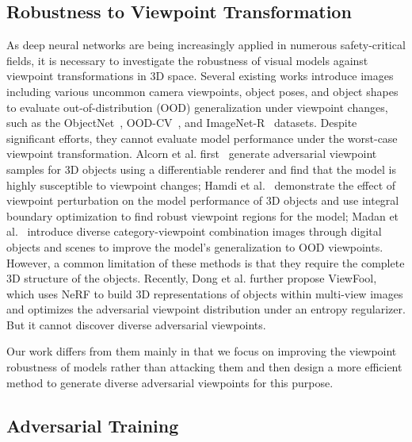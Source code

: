 \documentclass[10pt,journal,compsoc]{IEEEtran}
\begin{document}
\subsection{Robustness to Viewpoint Transformation}
As deep neural networks are being increasingly applied in numerous safety-critical fields, it is necessary to investigate the robustness of visual models against viewpoint transformations in 3D space. Several existing works introduce images including various uncommon camera viewpoints, object poses, and object shapes to evaluate out-of-distribution (OOD) generalization under viewpoint changes, such as the ObjectNet~\cite{barbu2019objectnet}, OOD-CV~\cite{zhao2022ood}, and ImageNet-R~\cite{hendrycks2021many} datasets. Despite significant efforts, they cannot evaluate model performance under the worst-case viewpoint transformation. Alcorn et al. first~\cite{alcorn2019strike} generate adversarial viewpoint samples for 3D objects using a differentiable renderer and find that the model is highly susceptible to viewpoint changes; Hamdi et al.~\cite{hamdi2020towards} demonstrate the effect of viewpoint perturbation on the model performance of 3D objects and use integral boundary optimization to find robust viewpoint regions for the model; Madan et al.~\cite{madan2020and} introduce diverse category-viewpoint combination images through digital objects and scenes to improve the model's generalization to OOD viewpoints. However, a common limitation of these methods is that they require the complete 3D structure of the objects. Recently, Dong et al. \cite{dong2022viewfool} further propose ViewFool, which uses NeRF to build 3D representations of objects within multi-view images and optimizes the adversarial viewpoint distribution under an entropy regularizer. But it cannot discover diverse adversarial viewpoints. 

Our work differs from them mainly in that we focus on improving the viewpoint robustness of models rather than attacking them and then design a more efficient method to generate diverse adversarial viewpoints for this purpose.


\subsection{Adversarial Training}
\label{sec:Spatial Robustness in Vision Recognition}

\end{document}
